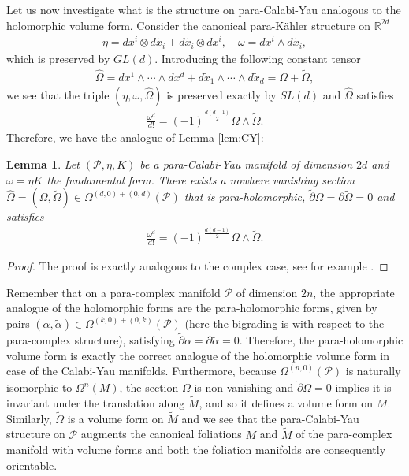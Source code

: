 \documentclass[letterpaper,12pt]{article}
\newcommand{\RR}{\mathbb{R}}
\newcommand{\PS}{\mathcal{P}}
\newcommand{\ap}{\alpha}
\def\w{\wedge}
\newcommand{\p}{\partial}
\newcommand{\pt}{\tilde{\partial}}
\newcommand{\xt}{{\tilde{x}}}
\newcommand{\Mt}{\tl{M}}
\def\tl{\tilde}
\newtheorem{lemma}[theorem]{Lemma}
\theoremstyle{definition}
\theoremstyle{remark}
\theoremstyle{examples}
\begin{document}
Let us now investigate what is the structure on para-Calabi-Yau analogous to the holomorphic volume form. Consider the canonical para-K\"ahler structure on $\RR^{2d}$
\begin{align*}
    \eta=dx^i\otimes d\xt_i+d\xt_i\otimes dx^i,\quad \omega=dx^i\w d\xt_i,
\end{align*}
which is preserved by $GL(d)$. Introducing the following constant tensor
\begin{align*}
    \hat{\Omega}=dx^1\w\cdots\w dx^d+d\xt_1\w\cdots\w d\xt_d=\Omega+\tl{\Omega},
\end{align*}
we see that the triple $(\eta,\omega,\hat{\Omega})$ is preserved exactly by $SL(d)$ and $\hat{\Omega}$ satisfies
\begin{align*}
   \frac{\omega^d}{d!}=(-1)^\frac{d(d-1)}{2} \Omega\w \tl{\Omega}. 
\end{align*}
Therefore, we have the analogue of Lemma \ref{lem:CY}:
\begin{lemma}
Let $(\PS,\eta,K)$ be a para-Calabi-Yau manifold of dimension $2d$ and $\omega=\eta K$ the fundamental form. There exists a nowhere vanishing section $\hat{\Omega}=(\Omega,\tl{\Omega}) \in\Omega^{(d,0)+(0,d)}(\PS)$ that is para-holomorphic, $\pt\Omega=\p\tl{\Omega}=0$ and satisfies
\begin{align*}
   \frac{\omega^d}{d!}=(-1)^\frac{d(d-1)}{2} \Omega\w \tl{\Omega}. 
\end{align*}
\end{lemma}
\begin{proof}
The proof is exactly analogous to the complex case, see for example \cite[Lemma~4.4]{Joyce:2001xt}.
\end{proof}

Remember that on a para-complex manifold $\PS$ of dimension $2n$, the appropriate analogue of the holomorphic forms are the para-holomorphic forms, given by pairs $(\alpha,\tl{\alpha})\in\Omega^{(k,0)+(0,k)}(\PS)$ (here the bigrading is with respect to the para-complex structure), satisfying $\pt\ap=\p\tl{\ap}=0$. Therefore, the {para-holomorphic volume form} is exactly the correct analogue of the holomorphic volume form in case of the Calabi-Yau manifolds. Furthermore, because $\Omega^{(n,0)}(\PS)$ is naturally isomorphic to $\Omega^n(M)$, the section $\Omega$ is non-vanishing and $\pt \Omega=0$ implies it is invariant under the translation along $\Mt$, and so it defines a volume form on $M$. Similarly, $\tl{\Omega}$ is a volume form on $\Mt$ and we see that the para-Calabi-Yau structure on $\PS$ augments the canonical foliations $M$ and $\Mt$ of the para-complex manifold with volume forms and both the foliation manifolds are consequently orientable.
\end{document}
